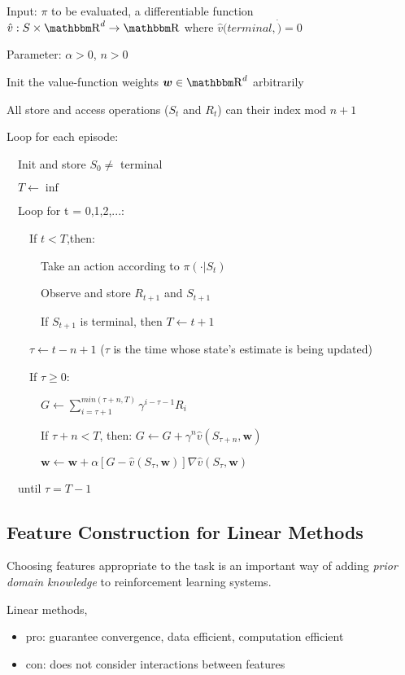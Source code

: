 \documentclass[sutton_barto_notes.tex]{subfiles}
\begin{document}
\begin{tcolorbox}[width=1.1\textwidth,title={n-step semi-gradient TD for estimating $\hat{v}\approx v_\pi$}]
Input: $\pi$ to be evaluated, a differentiable function $\hat{v}:S\times\R^d \rightarrow \R$ where $\hat{v}(terminal,\dot)=0$

Parameter: $\alpha > 0$, $n > 0$

Init the value-function weights $\bm{w} \in \R^d$ arbitrarily

All store and access operations ($S_t$ and $R_t$) can their index mod $n+1$

Loop for each episode:

$\quad$Init and store $S_0 \neq$ terminal

$\quad T \leftarrow \inf$

$\quad$Loop for t = 0,1,2,...:

$\quad\quad$If $t<T$,then:

$\quad\quad\quad$Take an action according to $\pi(\cdot|S_t)$

$\quad\quad\quad$Observe and store $R_{t+1}$ and $S_{t+1}$

$\quad\quad\quad$If $S_{t+1}$ is terminal, then $T \leftarrow t+1$

$\quad\quad\tau \leftarrow t-n+1$ ($\tau$ is the time whose state's estimate is being updated)

$\quad\quad$If $\tau \geq 0$:

$\quad\quad\quad G \leftarrow \sum_{i=\tau + 1}^{min(\tau+n,T)} \gamma^{i-\tau-1}R_i$

$\quad\quad\quad$If $\tau + n < T$, then: $G\leftarrow G+\gamma^n \hat{v} (S_{\tau + n}, \bm{w})$

$\quad\quad\quad \bm{w} \leftarrow \bm{w} + \alpha [G - \hat{v}(S_{\tau},\bm{w})]\nabla \hat{v}(S_{\tau},\bm{w})$

$\quad$until $\tau = T-1$
\end{tcolorbox}

\subsection{Feature Construction for Linear Methods}

Choosing features appropriate to the task is an important way of adding \textit{prior domain knowledge} to reinforcement learning systems.

Linear methods,
\begin{itemize}
\item pro: guarantee convergence, data efficient, computation efficient
\item con: does not consider interactions between features
\end{itemize}
\end{document}
